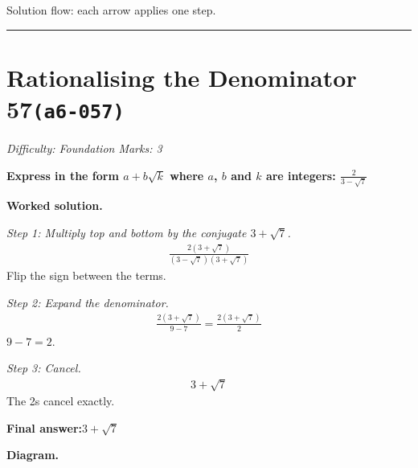 \documentclass[11pt]{article}
\newcommand{\question}[1]{\par\medskip\noindent\textbf{#1}\par}
\begin{document}
\begin{center}
\end{center}
\small Solution flow: each arrow applies one step.\normalsize

\medskip\hrule

\section*{Rationalising the Denominator 57\quad\small\texttt{(a6-057)}}
\textit{Difficulty: Foundation \quad\textbar\quad Marks: 3}

\question{Express in the form \( a + b\sqrt{k} \) where \( a \), \( b \) and \( k \) are integers: \( \frac{2}{3 - \sqrt{7}} \)}

\textbf{Worked solution.}

\textit{Step 1: Multiply top and bottom by the conjugate \( 3 + \sqrt{7} \).}
\[\begin{gathered}
\frac{2(3 + \sqrt{7})}{(3 - \sqrt{7})(3 + \sqrt{7})}
\end{gathered}\]
Flip the sign between the terms.

\textit{Step 2: Expand the denominator.}
\[\begin{gathered}
\frac{2(3 + \sqrt{7})}{9 - 7} = \frac{2(3 + \sqrt{7})}{2}
\end{gathered}\]
\( 9 - 7 = 2 \).

\textit{Step 3: Cancel.}
\[\begin{gathered}
3 + \sqrt{7}
\end{gathered}\]
The 2s cancel exactly.

\begin{answerbox}
\textbf{Final answer:}\quad \(\displaystyle 3 + \sqrt{7}\)
\end{answerbox}
\textbf{Diagram.}
\end{document}
